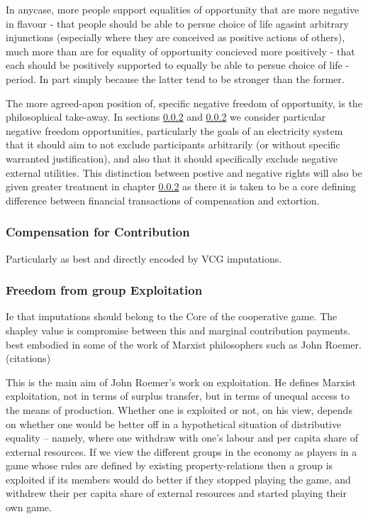 In anycase, more people support equalities of opportunity that are more negative in flavour - that people should be able to persue choice of life agasint arbitrary injunctions (especially where they are conceived as positive actions of others), 
much more than are for equality of opportunity concieved more positively - that each should be positively supported to equally be able to persue choice of life -period.
In part simply because the latter tend to be stronger than the former.


The more agreed-apon position of, specific negative freedom of opportunity, is the philosophical take-away.
In sections \ref{} and \ref{} we consider particular negative freedom opportunities, particularly the goals of an electricity system that it should aim to not exclude participants arbitrarily (or without specific warranted justification), and also that it should specifically exclude negative external utilities.
This distinction between postive and negative rights will also be given greater treatment in chapter \ref{} as there it is taken to be a core defining difference between financial transactions of compensation and extortion.







\subsubsection{Compensation for Contribution}

Particularly as best and directly encoded by VCG imputations.

\subsubsection{Freedom from group Exploitation}

Ie that imputations should belong to the Core of the cooperative game.
The shapley value is compromise between this and marginal contribution payments.
best embodied in some of the work of Marxist philosophers such as John Roemer. (citations)

\begin{displayquote}
This is the main aim of John Roemer's work on exploitation. He defines Marxist exploitation, not in terms of surplus transfer, but in terms of unequal access to the means of production. Whether one is exploited or not, on his view, depends on whether one would be better off in a hypothetical situation of distributive equality -- namely, where one withdraw with one's labour and per capita share of external resources. If we view the different groups in the economy as players in a game whose rules are defined by existing property-relations then a group is exploited if its members would do better if they stopped playing the game, and withdrew their per capita share of external resources and started playing their own game.\cite{kymlicka2002contemporary}
\end{displayquote}


